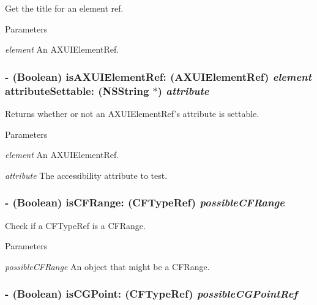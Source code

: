 Get the title for an element ref. 
\begin{DoxyParams}{Parameters}
\item[{\em element}]An AXUIElementRef. \end{DoxyParams}
\hypertarget{interface_g_d_accessibility_manager_ac28b17f1ec344fc9edb3de8c0a05b40f}{
\subsubsection[{isAXUIElementRef:attributeSettable:}]{\setlength{\rightskip}{0pt plus 5cm}-\/ (Boolean) isAXUIElementRef: (AXUIElementRef) {\em element}\/ attributeSettable: (NSString $\ast$) {\em attribute}}}
\label{interface_g_d_accessibility_manager_ac28b17f1ec344fc9edb3de8c0a05b40f}


Returns whether or not an AXUIElementRef's attribute is settable. 
\begin{DoxyParams}{Parameters}
\item[{\em element}]An AXUIElementRef. \item[{\em attribute}]The accessibility attribute to test. \end{DoxyParams}
\hypertarget{interface_g_d_accessibility_manager_ac7682be7c9d421b3b6aff5bd0427c484}{
\subsubsection[{isCFRange:}]{\setlength{\rightskip}{0pt plus 5cm}-\/ (Boolean) isCFRange: (CFTypeRef) {\em possibleCFRange}}}
\label{interface_g_d_accessibility_manager_ac7682be7c9d421b3b6aff5bd0427c484}


Check if a CFTypeRef is a CFRange. 
\begin{DoxyParams}{Parameters}
\item[{\em possibleCFRange}]An object that might be a CFRange. \end{DoxyParams}
\hypertarget{interface_g_d_accessibility_manager_a76393da95b202ecff6dd43e663539b62}{
\subsubsection[{isCGPoint:}]{\setlength{\rightskip}{0pt plus 5cm}-\/ (Boolean) isCGPoint: (CFTypeRef) {\em possibleCGPointRef}}}
\label{interface_g_d_accessibility_manager_a76393da95b202ecff6dd43e663539b62}


